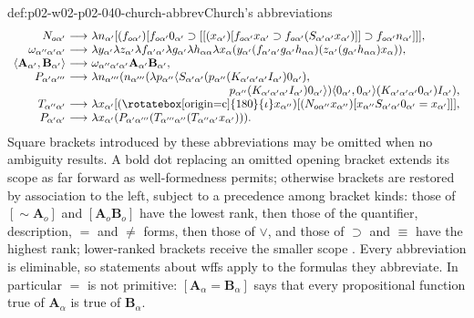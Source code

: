 \begin{hbdefinition}{def:p02-w02-p02-040-church-abbrev}{Church's abbreviations}
\[\begin{array}{r@{\ \longrightarrow\ }l}
 N_{o\alpha'} & \lambda n_{\alpha'}[(f_{o\alpha'})[f_{o\alpha'}0_{\alpha'}\supset[[(x_{\alpha'})[f_{o\alpha'}x_{\alpha'}\supset f_{o\alpha'}(S_{\alpha'\alpha'}x_{\alpha'})]]\supset f_{o\alpha'}n_{\alpha'}]]],\\
 \omega_{\alpha''\alpha'\alpha'} & \lambda y_{\alpha'}\lambda z_{\alpha'}\lambda f_{\alpha'\alpha'}\lambda g_{\alpha'}\lambda h_{\alpha\alpha}\lambda x_\alpha(y_{\alpha'}(f_{\alpha'\alpha'}g_{\alpha'}h_{\alpha\alpha})(z_{\alpha'}(g_{\alpha'}h_{\alpha\alpha})x_\alpha)),\\
 \langle\mathbf A_{\alpha'},\mathbf B_{\alpha'}\rangle & \omega_{\alpha''\alpha'\alpha'}\mathbf A_{\alpha'}\mathbf B_{\alpha'},\\
 P_{\alpha'\alpha'''} & \lambda n_{\alpha'''}(n_{\alpha'''}(\lambda p_{\alpha''}\langle S_{\alpha'\alpha'}(p_{\alpha''}(K_{\alpha'\alpha'\alpha'}I_{\alpha'})0_{\alpha'}),\\
 \multicolumn{2}{r}{p_{\alpha''}(K_{\alpha'\alpha'\alpha'}I_{\alpha'})0_{\alpha'}\rangle)\langle0_{\alpha'},0_{\alpha'}\rangle(K_{\alpha'\alpha'\alpha'}0_{\alpha'})I_{\alpha'}),}\\
 T_{\alpha''\alpha'} & \lambda x_{\alpha'}[(\text{\rotatebox[origin=c]{180}{\(\iota\)}}x_{\alpha''})[(N_{o\alpha''}x_{\alpha''})[x_{\alpha''}S_{\alpha'\alpha'}0_{\alpha'}=x_{\alpha'}]]],\\
 P_{\alpha'\alpha'} & \lambda x_{\alpha'}(P_{\alpha'\alpha'''}(T_{\alpha'''\alpha''}(T_{\alpha''\alpha'}x_{\alpha'}))).
\end{array}
\]
Square brackets introduced by these abbreviations may be omitted when no
ambiguity results.  A bold dot replacing an omitted opening bracket extends
its scope as far forward as well-formedness permits; otherwise brackets are
restored by association to the left, subject to a precedence among bracket
kinds: those of \([\sim\mathbf A_o]\) and \([\mathbf A_o\mathbf B_o]\) have the
lowest rank, then those of the quantifier, description, \(=\) and \(\neq\)
forms, then those of \(\vee\), and those of \(\supset\) and \(\equiv\) have
the highest rank; lower-ranked brackets receive the smaller scope
\cite[\S2, pp.~58--59]{Church1940}.  Every abbreviation is eliminable, so
statements about wffs apply to the formulas they abbreviate.  In
particular \(=\) is not primitive: \([\mathbf A_\alpha=\mathbf B_\alpha]\)
says that every propositional function true of \(\mathbf A_\alpha\) is true
of \(\mathbf B_\alpha\).
\end{hbdefinition}


